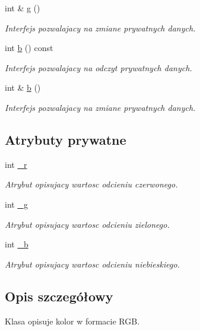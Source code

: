 \begin{DoxyCompactItemize}
int \& \hyperlink{class_kolor_ab5e20d58c58d42747c16155a83aa906f}{g} ()
\begin{DoxyCompactList}\small\item\em Interfejs pozwalajacy na zmiane prywatnych danych. \end{DoxyCompactList}\item 
int \hyperlink{class_kolor_aa240903064a3d8f49585c34d92b74e5d}{b} () const 
\begin{DoxyCompactList}\small\item\em Interfejs pozwalajacy na odczyt prywatnych danych. \end{DoxyCompactList}\item 
int \& \hyperlink{class_kolor_a87677bdafb912de9526302f4844f86a7}{b} ()
\begin{DoxyCompactList}\small\item\em Interfejs pozwalajacy na zmiane prywatnych danych. \end{DoxyCompactList}\end{DoxyCompactItemize}
\subsection*{Atrybuty prywatne}
\begin{DoxyCompactItemize}
\item 
int \hyperlink{class_kolor_ad887fb53be523b39fbead6a24671751e}{\-\_\-r}
\begin{DoxyCompactList}\small\item\em Atrybut opisujacy wartosc odcieniu czerwonego. \end{DoxyCompactList}\item 
int \hyperlink{class_kolor_a568f73268d43f0e76c8ae75f0ef20229}{\-\_\-g}
\begin{DoxyCompactList}\small\item\em Atrybut opisujacy wartosc odcieniu zielonego. \end{DoxyCompactList}\item 
int \hyperlink{class_kolor_a543b5984743ac9d471409c697382038b}{\-\_\-b}
\begin{DoxyCompactList}\small\item\em Atrybut opisujacy wartosc odcieniu niebieskiego. \end{DoxyCompactList}\end{DoxyCompactItemize}


\subsection{Opis szczegółowy}
Klasa opisuje kolor w formacie R\-G\-B. 

